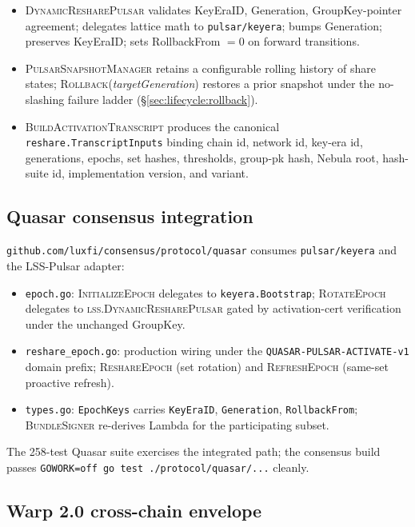 \begin{itemize}
\item \textsc{DynamicResharePulsar} validates KeyEraID, Generation, GroupKey-pointer agreement; delegates lattice math to \texttt{pulsar/keyera}; bumps Generation; preserves KeyEraID; sets RollbackFrom $= 0$ on forward transitions.
\item \textsc{PulsarSnapshotManager} retains a configurable rolling history of share states; \textsc{Rollback}(\textit{targetGeneration}) restores a prior snapshot under the no-slashing failure ladder (\S\ref{sec:lifecycle:rollback}).
\item \textsc{BuildActivationTranscript} produces the canonical \texttt{reshare.TranscriptInputs} binding chain id, network id, key-era id, generations, epochs, set hashes, thresholds, group-pk hash, Nebula root, hash-suite id, implementation version, and variant.
\end{itemize}

\subsection{Quasar consensus integration}

\texttt{github.com/luxfi/consensus/protocol/quasar} consumes \texttt{pulsar/keyera} and the LSS-Pulsar adapter:

\begin{itemize}
\item \texttt{epoch.go}: \textsc{InitializeEpoch} delegates to \texttt{keyera.Bootstrap}; \textsc{RotateEpoch} delegates to \textsc{lss.DynamicResharePulsar} gated by activation-cert verification under the unchanged GroupKey.
\item \texttt{reshare\_epoch.go}: production wiring under the \texttt{QUASAR-PULSAR-ACTIVATE-v1} domain prefix; \textsc{ReshareEpoch} (set rotation) and \textsc{RefreshEpoch} (same-set proactive refresh).
\item \texttt{types.go}: \texttt{EpochKeys} carries \texttt{KeyEraID}, \texttt{Generation}, \texttt{RollbackFrom}; \textsc{BundleSigner} re-derives Lambda for the participating subset.
\end{itemize}

The 258-test Quasar suite exercises the integrated path; the consensus build passes \texttt{GOWORK=off go test ./protocol/quasar/...} cleanly.

\subsection{Warp 2.0 cross-chain envelope}

